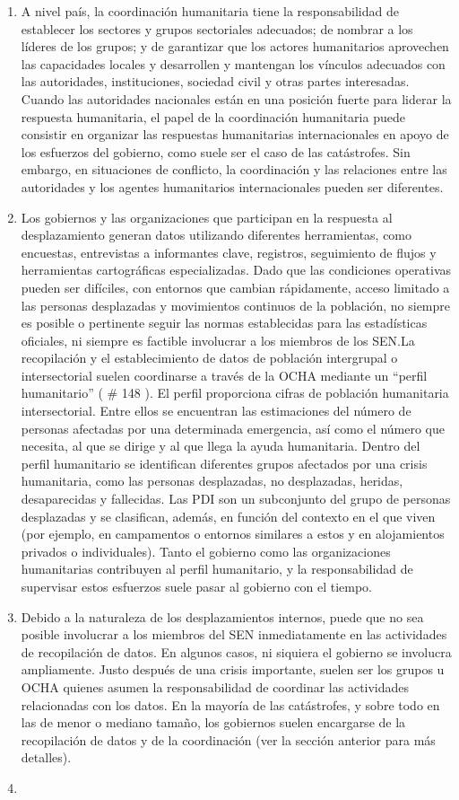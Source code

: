 \documentclass[
]{book}
\begin{document}
\begin{enumerate}
\item
  A nivel país, la coordinación humanitaria tiene la responsabilidad de establecer los sectores y grupos sectoriales adecuados; de nombrar a los líderes de los grupos; y de garantizar que los actores humanitarios aprovechen las capacidades locales y desarrollen y mantengan los vínculos adecuados con las autoridades, instituciones, sociedad civil y otras partes interesadas. Cuando las autoridades nacionales están en una posición fuerte para liderar la respuesta humanitaria, el papel de la coordinación humanitaria puede consistir en organizar las respuestas humanitarias internacionales en apoyo de los esfuerzos del gobierno, como suele ser el caso de las catástrofes. Sin embargo, en situaciones de conflicto, la coordinación y las relaciones entre las autoridades y los agentes humanitarios internacionales pueden ser diferentes.
\item
  Los gobiernos y las organizaciones que participan en la respuesta al desplazamiento generan datos utilizando diferentes herramientas, como encuestas, entrevistas a informantes clave, registros, seguimiento de flujos y herramientas cartográficas especializadas. Dado que las condiciones operativas pueden ser difíciles, con entornos que cambian rápidamente, acceso limitado a las personas desplazadas y movimientos continuos de la población, no siempre es posible o pertinente seguir las normas establecidas para las estadísticas oficiales, ni siempre es factible involucrar a los miembros de los SEN.La recopilación y el establecimiento de datos de población intergrupal o intersectorial suelen coordinarse a través de la OCHA mediante un ``perfil humanitario'' (
  \# 148
  ). El perfil proporciona cifras de población humanitaria intersectorial. Entre ellos se encuentran las estimaciones del número de personas afectadas por una determinada emergencia, así como el número que necesita, al que se dirige y al que llega la ayuda humanitaria. Dentro del perfil humanitario se identifican diferentes grupos afectados por una crisis humanitaria, como las personas desplazadas, no desplazadas, heridas, desaparecidas y fallecidas. Las PDI son un subconjunto del grupo de personas desplazadas y se clasifican, además, en función del contexto en el que viven (por ejemplo, en campamentos o entornos similares a estos y en alojamientos privados o individuales). Tanto el gobierno como las organizaciones humanitarias contribuyen al perfil humanitario, y la responsabilidad de supervisar estos esfuerzos suele pasar al gobierno con el tiempo.
\item
  Debido a la naturaleza de los desplazamientos internos, puede que no sea posible involucrar a los miembros del SEN inmediatamente en las actividades de recopilación de datos. En algunos casos, ni siquiera el gobierno se involucra ampliamente. Justo después de una crisis importante, suelen ser los grupos u OCHA quienes asumen la responsabilidad de coordinar las actividades relacionadas con los datos. En la mayoría de las catástrofes, y sobre todo en las de menor o mediano tamaño, los gobiernos suelen encargarse de la recopilación de datos y de la coordinación (ver la sección anterior para más detalles).
\item ~
  \hypertarget{retos-en-la-recopilaciuxf3n-de-datos-operativos-sobre-pdi}{%
}
\end{enumerate}
\end{document}
